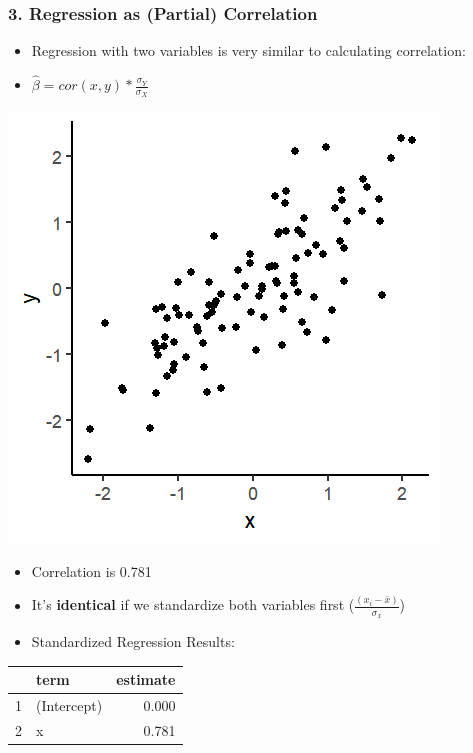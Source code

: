 \documentclass[xcolor=x11names,compress]{beamer}\usepackage[]{graphicx}\usepackage[]{color}
\makeatletter
\def\maxwidth{ %
  \ifdim\Gin@nat@width>\linewidth
    \linewidth
  \else
    \Gin@nat@width
  \fi
}
\newenvironment{knitrout}{}{} %
\renewcommand{\(}{\begin{columns}}
\renewcommand{\)}{\end{columns}}
\newcommand{\<}[1]{\begin{column}{#1}}
\renewcommand{\>}{\end{column}}
\makeatother
\begin{document}
\begin{frame}
\frametitle{3. Regression as (Partial) Correlation}
\begin{itemize}
\item Regression with two variables is very similar to calculating correlation:
\item $\hat{\beta}=cor(x,y) * \frac{\sigma_Y}{\sigma_X}$
\end{itemize}
\begin{multicols}{2}
\begin{knitrout}
\color{fgcolor}
\includegraphics[width=\maxwidth]{figure/corr_regn_fig3-1} 

\end{knitrout}
\columnbreak
\begin{itemize}
\item Correlation is 0.781
\item It's \textbf{identical} if we standardize both variables first ($\frac{(x_i-\bar{x})}{\sigma_x}$)
\item Standardized Regression Results:
\end{itemize}
\begin{table}[ht]
\centering
\begin{tabular}{rlr}
  \hline
 & term & estimate \\ 
  \hline
1 & (Intercept) & 0.000 \\ 
  2 & x & 0.781 \\ 
   \hline
\end{tabular}
\end{table}

\end{multicols}
\end{frame}
\end{document}
